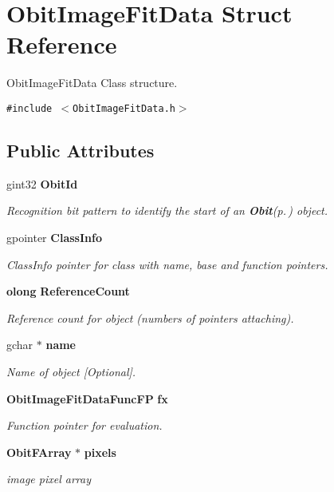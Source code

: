 \section{Obit\-Image\-Fit\-Data Struct Reference}
\label{structObitImageFitData}
Obit\-Image\-Fit\-Data Class structure.  


{\tt \#include $<$Obit\-Image\-Fit\-Data.h$>$}

\subsection*{Public Attributes}
\begin{CompactItemize}
\item 
gint32 {\bf Obit\-Id}
\begin{CompactList}\small\item\em Recognition bit pattern to identify the start of an {\bf Obit}{\rm (p.\,\pageref{structObit})} object. \item\end{CompactList}\item 
gpointer {\bf Class\-Info}
\begin{CompactList}\small\item\em Class\-Info pointer for class with name, base and function pointers. \item\end{CompactList}\item 
{\bf olong} {\bf Reference\-Count}
\begin{CompactList}\small\item\em Reference count for object (numbers of pointers attaching). \item\end{CompactList}\item 
gchar $\ast$ {\bf name}
\begin{CompactList}\small\item\em Name of object [Optional]. \item\end{CompactList}\item 
{\bf Obit\-Image\-Fit\-Data\-Func\-FP} {\bf fx}
\begin{CompactList}\small\item\em Function pointer for evaluation. \item\end{CompactList}\item 
{\bf Obit\-FArray} $\ast$ {\bf pixels}
\begin{CompactList}\small\item\em image pixel array \item\end{CompactList}\item 

\end{CompactItemize}
